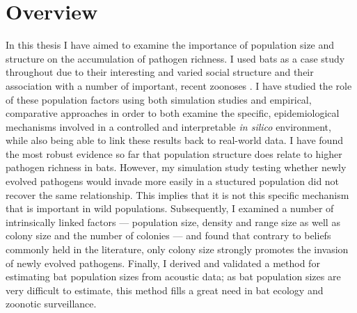 
\section{Overview}

In this thesis I have aimed to examine the importance of population size and structure on the accumulation of pathogen richness.
I used bats as a case study throughout due to their interesting and varied social structure \cite{kerth2008causes} and their association with a number of important, recent zoonoses \cite{leroy2005fruit, field2001natural, halpin2011pteropid, li2005bats}.
I have studied the role of these population factors using both simulation studies and empirical, comparative approaches in order to both examine the specific, epidemiological mechanisms involved in a controlled and interpretable \emph{in silico} environment, while also being able to link these results back to real-world data.
I have found the most robust evidence so far that population structure does relate to higher pathogen richness in bats.
However, my simulation study testing whether newly evolved pathogens would invade more easily in a stuctured population did not recover the same relationship. 
This implies that it is not this specific mechanism that is important in wild populations.
Subsequently, I examined a number of intrinsically linked factors --- population size, density and range size as well as colony size and the number of colonies --- and found that contrary to beliefs commonly held in the literature, only colony size strongly promotes the invasion of newly evolved pathogens.
Finally, I derived and validated a method for estimating bat population sizes from acoustic data; as bat population sizes are very difficult to estimate, this method fills a great need in bat ecology and zoonotic surveillance.




